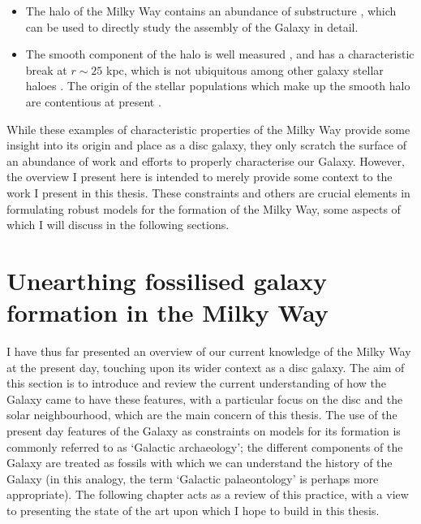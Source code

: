\begin{itemize}
    \item The halo of the Milky Way contains an abundance of substructure \citep{2013NewAR..57..100B}, which can be used to directly study the assembly of the Galaxy in detail.
    \item The smooth component of the halo is well measured \citep[e.g.][]{2011MNRAS.416.2903D}, and has a characteristic break at $r\sim 25$ kpc, which is not ubiquitous among other galaxy stellar haloes \citep[e.g.][]{2013ApJ...763..113D}. The origin of the stellar populations which make up the smooth halo are contentious at present \citep[e.g.][]{2007Natur.450.1020C,2012ApJ...746...34B,2014ApJ...786....7S}.
\end{itemize}

While these examples of characteristic properties of the Milky Way provide some insight into its origin and place as a disc galaxy, they only scratch the surface of an abundance of work and efforts to properly characterise our Galaxy. However, the overview I present here is intended to merely provide some context to the work I present in this thesis. These constraints and others are crucial elements in formulating robust models for the formation of the Milky Way, some aspects of which I will discuss in the following sections.

\section{Unearthing fossilised galaxy formation in the Milky Way}
\label{sec:galacticarchaeology}

I have thus far presented an overview of our current knowledge of the Milky Way at the present day, touching upon its wider context as a disc galaxy. The aim of this section is to introduce and review the current understanding of how the Galaxy came to have these features, with a particular focus on the disc and the solar neighbourhood, which are the main concern of this thesis. The use of the present day features of the Galaxy as constraints on models for its formation is commonly referred to as `Galactic archaeology'; the different components of the Galaxy are treated as fossils with which we can understand the history of the Galaxy (in this analogy, the term `Galactic palaeontology' is perhaps more appropriate). The following chapter acts as a review of this practice, with a view to presenting the state of the art upon which I hope to build in this thesis.

